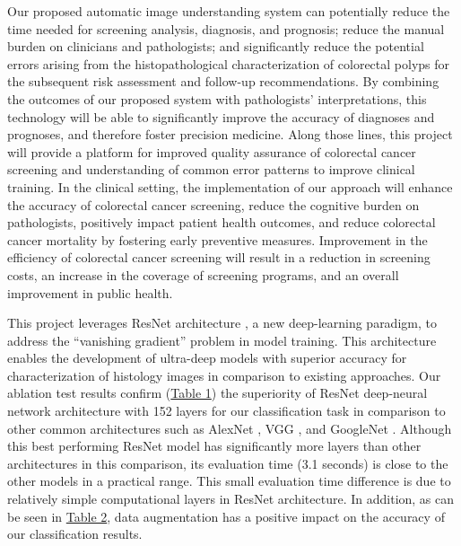 \documentclass[review]{elsarticle}
\begin{document}
Our proposed automatic image understanding system can potentially reduce the time needed for screening analysis, diagnosis, and prognosis; reduce the manual burden on clinicians and pathologists; and significantly reduce the potential errors arising from the histopathological characterization of colorectal polyps for the subsequent risk assessment and follow-up recommendations. By combining the outcomes of our proposed system with pathologists' interpretations, this technology will be able to significantly improve the accuracy of diagnoses and prognoses, and therefore foster precision medicine. Along those lines, this project will provide a platform for improved quality assurance of colorectal cancer screening and understanding of common error patterns to improve clinical training. In the clinical setting, the implementation of our approach will enhance the accuracy of colorectal cancer screening, reduce the cognitive burden on pathologists, positively impact patient health outcomes, and reduce colorectal cancer mortality by fostering early preventive measures. Improvement in the efficiency of colorectal cancer screening will result in a reduction in screening costs, an increase in the coverage of screening programs, and an overall improvement in public health.

This project leverages ResNet architecture \citep{he2015deep}, a new deep-learning paradigm, to address the “vanishing gradient” problem in model training. This architecture enables the development of ultra-deep models with superior accuracy for characterization of histology images in comparison to existing approaches. Our ablation test results confirm (\hyperref[table:ablation]{Table 1}) the superiority of ResNet deep-neural network architecture with 152 layers for our classification task in comparison to other common architectures such as AlexNet \citep{krizhevsky2012imagenet}, VGG \citep{simonyan2013deep}, and GoogleNet \citep{szegedy2015going}. Although this best performing ResNet model has significantly more layers than other architectures in this comparison, its evaluation time (3.1 seconds) is close to the other models in a practical range. This small evaluation time difference is due to relatively simple computational layers in ResNet architecture. In addition, as can be seen in  \hyperref[table:byclass_crops]{Table 2}, data augmentation has a positive impact on the accuracy of our classification results.
\end{document}
